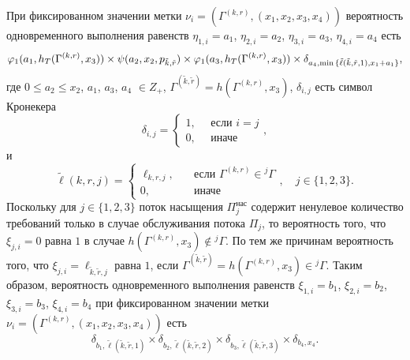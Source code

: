 \documentclass[a4paper,12pt,russian]{extarticle}
\newcommand{\G}{\Gamma}
\newcommand{\ga}[1]{\Gamma^{\left( #1 \right)} }
\begin{document}
При фиксированном значении метки $\nu_i=(\ga{k,r},(x_1, x_2, x_3, x_4))$ вероятность одновременного выполнения равенств $\eta_{1,i}=a_1$, $\eta_{2,i}=a_2$, $\eta_{3,i}=a_3$, $\eta_{4,i}=a_4$ есть 
\begin{equation}
\vp_1(a_1,h_T(\ga{{k},{r}},x_3)) \times \psi(a_2,x_2, p_{\tilde{k},\tilde{r}}) \times \vp_1(a_3,h_T(\ga{{k},{r}},x_3))
\times \delta_{a_4,\min{\{\tilde{\ell}(\tilde{k},\tilde{r},1), x_1+a_1}\}},
\label{conditionProbOne}
\end{equation}
где $0\leqslant a_2\leqslant x_2$, $a_1$, $a_3$, $a_4$ $\in Z_+$, $\ga{\tilde{k},\tilde{r}}=h(\ga{k,r},x_3)$,  $\delta_{i,j}$ есть символ Кронекера
\begin{equation*}
\delta_{i,j}=\begin{cases} 1, \quad \text{ если }i=j\\0, \quad \text{ иначе}
\end{cases},
\end{equation*}
и
\begin{equation*}
\widetilde{\ell}(k,r,j)=\begin{cases}\ell_{k,r,j},& \quad \text{если } \ga{k,r} \in {}^j\G\\0,& \quad \text{иначе}  \end{cases},
\quad j\in \{1, 2, 3\}.
\end{equation*}
Поскольку для $j\in \{1, 2, 3\}$ поток насыщения $\Pi_j^{\mathrm{\text{нас}}}$ содержит ненулевое количество требований только в случае обслуживания потока $\Pi_j$, то вероятность того, что $\xi_{j,i} = 0$ равна $1$ в случае $h(\ga{k,r},x_3)\notin {}^j\G$. По тем же причинам вероятность того, что $\xi_{j,i} = \ell_{\tilde{k},\tilde{r},j}$ равна $1$, если $\ga{\tilde{k},\tilde{r}}=h(\ga{k,r},x_3)\in {}^j\G$. Таким образом, вероятность одновременного выполнения равенств $\xi_{1,i}=b_1$, $\xi_{2,i}=b_2$, $\xi_{3,i}=b_3$, $\xi_{4,i}=b_4$ при фиксированном значении метки $\nu_i=(\ga{k,r},(x_1, x_2, x_3, x_4))$ есть
\begin{equation}
\delta_{b_1,\tilde{\ell}(\tilde{k},\tilde{r},1)} \times \delta_{b_2,\tilde{\ell}(\tilde{k},\tilde{r},2)} \times 
\delta_{b_3,\tilde{\ell}(\tilde{k},\tilde{r},3)} \times \delta_{b_4,x_4}.
\label{conditionProbTwo}
\end{equation}

\end{document}
